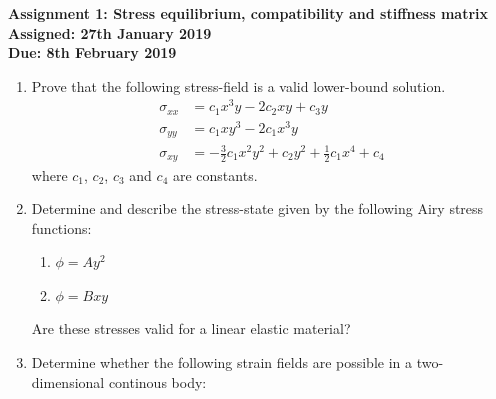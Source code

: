 \documentclass[a4paper,12pt]{article}
\begin{document}
\begin{centering}
	\textbf{
		Assignment 1: Stress equilibrium, compatibility and stiffness matrix\\
		Assigned: 27th January 2019\\
		Due: 8th February 2019\\
	}
\end{centering}

\vspace{1em}
 
\begin{enumerate}
	\item Prove that the following stress-field is a valid lower-bound solution.
	\begin{align*}
		\sigma_{xx} & = c_1 x^3 y - 2c_2 xy + c_3 y\\
		\sigma_{yy} & = c_1 x y^3 - 2c_1 x^3 y\\
		\sigma_{xy} & = -\frac{3}{2}c_1x^2y^2 + c_2 y^2 + \frac{1}{2}c_1 x^4 + c_4
	\end{align*}
	where $c_1$, $c_2$, $c_3$ and $c_4$ are constants.

	\item Determine and describe the stress-state given by the following Airy stress functions:
	\begin{enumerate}
		\item $\phi = Ay^2$ 
		\item $\phi = Bxy$
	\end{enumerate}
	Are these stresses valid for a linear elastic material?

	\item Determine whether the following strain fields are possible in a two-dimensional continous body:
	

\end{enumerate}
\end{document}

